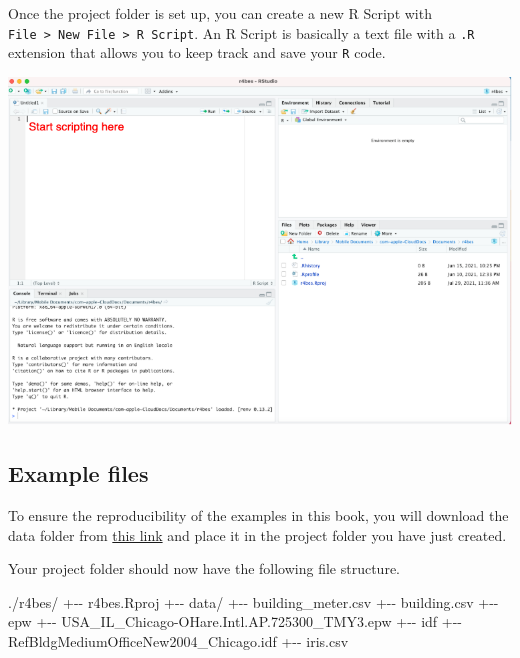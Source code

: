 \documentclass[
]{book}
\newenvironment{Shaded}{\begin{snugshade}}{\end{snugshade}}
\newcommand{\FloatTok}[1]{\textcolor[rgb]{0.00,0.00,0.81}{#1}}
\newcommand{\NormalTok}[1]{#1}
\newcommand{\SpecialCharTok}[1]{\textcolor[rgb]{0.00,0.00,0.00}{#1}}
\begin{document}
Once the project folder is set up, you can create a new R Script with \texttt{File\ \textgreater{}\ New\ File\ \textgreater{}\ R\ Script}. An R Script is basically a text file with a \texttt{.R} extension that allows you to keep track and save your \texttt{R} code.

\begin{center}\includegraphics[width=1\linewidth]{figures/script} \end{center}

\hypertarget{example-files}{%
\subsection*{Example files}\label{example-files}}

To ensure the reproducibility of the examples in this book, you will download the data folder from \href{https://nusu.sharepoint.com/sites/RforBuildingEnergySimulation/Shared\%20Documents/General/data.zip}{this link} and place it in the project folder you have just created.

Your project folder should now have the following file structure.

\begin{Shaded}
\begin{Highlighting}[]
\NormalTok{.}\SpecialCharTok{/}\NormalTok{r4bes}\SpecialCharTok{/}
  \SpecialCharTok{+{-}{-}}\NormalTok{ r4bes.Rproj}
  \SpecialCharTok{+{-}{-}}\NormalTok{ data}\SpecialCharTok{/}
      \SpecialCharTok{+{-}{-}}\NormalTok{ building\_meter.csv}
      \SpecialCharTok{+{-}{-}}\NormalTok{ building.csv}
      \SpecialCharTok{+{-}{-}}\NormalTok{ epw}
          \SpecialCharTok{+{-}{-}}\NormalTok{ USA\_IL\_Chicago}\SpecialCharTok{{-}}\NormalTok{OHare.Intl.AP}\FloatTok{.725300}\NormalTok{\_TMY3.epw}
      \SpecialCharTok{+{-}{-}}\NormalTok{ idf}
          \SpecialCharTok{+{-}{-}}\NormalTok{ RefBldgMediumOfficeNew2004\_Chicago.idf}
      \SpecialCharTok{+{-}{-}}\NormalTok{ iris.csv}
\end{Highlighting}
\end{Shaded}
\end{document}
